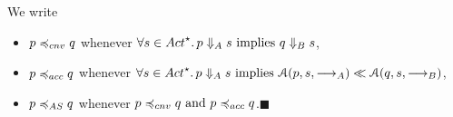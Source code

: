   \newcommand{\cnvalongLTS}[2]{ \Downarrow_{#1} #2 }

   \begin{definition}
  \label{def:accset-leq}%
  \label{def:standard-char}
  {We write}
  \begin{itemize}
  \item
    $
    \serverA \bhvleqone \serverB$ whenever $\forall \trace \in \Actfin \suchthat
    \serverA \cnvalongLTS{\StatesA}{ \trace } \implies \serverB \cnvalongLTS{\StatesB}{ \trace }
    $,
    
  \item
    $
    \serverA \bhvleqtwo \serverB$ whenever $\forall \trace \in \Actfin \suchthat
    \serverA \cnvalongLTS{\StatesA}{ \trace }  \implies 
    \accP{ \serverA }{ \trace }{ \st{}_{\StatesA} }
    \ll \accP{ \serverB }{ \trace }{ \st{}_{\StatesB} }
    $,
  \item
    $\serverA \asleq \serverB$ whenever $\serverA \bhvleqone
    \serverB  \text{ and }  \serverA \bhvleqtwo \serverB$.\hfill$\blacksquare$
  \end{itemize}  
   \end{definition}


